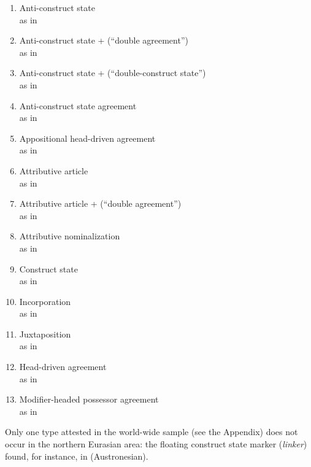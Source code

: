\begin{enumerate}
\item Anti\hyp{}construct state\\as in 
\item Anti\hyp{}construct state +  (“double agreement”)\\as in 
\item Anti\hyp{}construct state +  (“double\hyp{}construct state”)\\as in 
\item Anti\hyp{}construct state agreement\\as in 
\item Appositional head\hyp{}driven agreement\\as in 
\item Attributive article\\as in 
\item Attributive article +  (“double agreement”)\\as in 
\item Attributive nominalization\\as in 
\item Construct state\\as in 
\item Incorporation\\as in 
\item Juxtaposition\\as in 
\item Head\hyp{}driven agreement\\as in 
\item Modifier\hyp{}headed possessor agreement\\as in 
\end{enumerate}
Only one type attested in the world-wide sample (see the Appendix) does not occur in the northern Eurasian area: the floating construct state marker (\textit{linker}) found, for instance, in  (Austronesian). 

